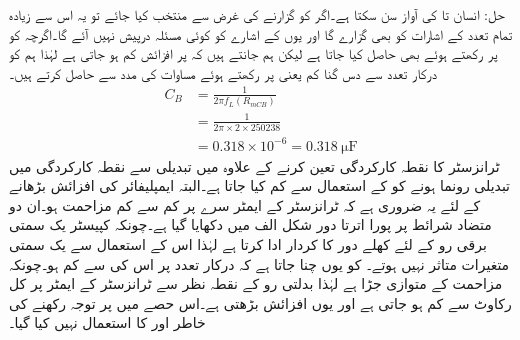 حل: انسان  تا  کی آواز سن سکتا ہے۔اگر  کو   گزارنے کی غرض سے منتخب کیا جائے تو یہ اس سے زیادہ تمام تعدد کے اشارات کو بھی گزارے گا اور یوں  کے اشارے کو کوئی مسئلہ درپیش نہیں آئے گا۔اگرچہ   کو   پر رکھتے ہوئے بھی  حاصل کیا جاتا ہے لیکن ہم جانتے ہیں کہ  پر افزائش کم ہو جاتی ہے لہٰذا ہم   کو درکار تعدد سے دس گنا کم یعنی   پر رکھتے ہوئے مساوات   کی مدد سے  حاصل کرتے ہیں۔
\begin{align*}
C_B&=\frac{1}{2 \pi f_L \left(R_{mCB} \right ) }\\
&=\frac{1}{2 \pi \times 2 \times 250238 }\\
&=0.318 \times 10^{-6}= \SI{0.318}{\micro \farad}
\end{align*}
ٹرانزسٹر کا نقطہ کارکردگی تعین کرنے کے علاوہ   میں تبدیلی سے  نقطہ کارکردگی میں تبدیلی رونما ہونے کو  کے استعمال سے کم کیا جاتا ہے۔البتہ ایمپلیفائر کی افزائش بڑھانے کے  لئے یہ ضروری ہے کہ ٹرانزسٹر کے ایمٹر سرے پر کم سے کم مزاحمت ہو۔ان دو متضاد شرائط پر پورا اترتا دور شکل  الف میں دکھایا گیا ہے۔چونکہ کپیسٹر  یک سمتی برقی رو کے لئے کھلے دور کا کردار ادا کرتا ہے لہٰذا اس کے استعمال سے یک سمتی متغیرات متاثر نہیں ہوتے۔ کو یوں چنا جاتا ہے کہ درکار تعدد پر اس کی   سے کم ہو۔چونکہ  مزاحمت  کے متوازی جڑا ہے لہٰذا بدلتی رو کے نقطہ نظر سے ٹرانزسٹر کے ایمٹر پر کل رکاوٹ  سے کم ہو جاتی ہے اور یوں افزائش بڑھتی ہے۔اس حصے میں  پر توجہ رکھنے کی خاطر  اور  کا استعمال نہیں کیا گیا۔

